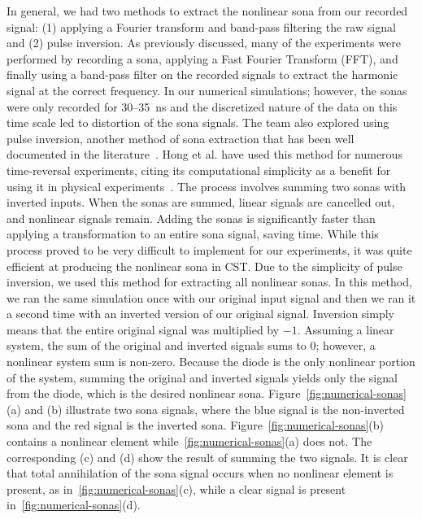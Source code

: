 In general, we had two methods to extract the nonlinear sona from our recorded signal: (1) applying a Fourier transform and band-pass filtering the raw signal and (2) pulse inversion. As previously discussed, many of the \giga{} experiments were performed by recording a sona, applying a Fast Fourier Transform (FFT), and finally using a band-pass filter on the recorded signals to extract the harmonic signal at the correct frequency. In our numerical simulations; however, the sonas were only recorded for \numrange{30}{35}~ns and the discretized nature of the data on this time scale led to distortion of the sona signals.
The team also explored using pulse inversion, another method of sona extraction that has been well documented in the literature~\cite{simpson_pulse_1999,hong_nonlinear_2014}. Hong et al. have used this method for numerous time-reversal experiments, citing its computational simplicity as a benefit for using it in physical experiments~\cite{hong_nonlinear_2014}. The process involves summing two sonas with inverted inputs.  When the sonas are summed, linear signals are cancelled out, and nonlinear signals remain. Adding the sonas is significantly faster than applying a transformation to an entire sona signal, saving time. While this process proved to be very difficult to implement for our \giga{} experiments, it was quite efficient at producing the nonlinear sona in CST.
Due to the simplicity of pulse inversion, we used this method for extracting all nonlinear sonas. In this method, we ran the same simulation once with our original input signal and then we ran it a second time with an inverted version of our original signal. Inversion simply means that the entire original signal was multiplied by $-1$. Assuming a linear system, the sum of the original and inverted signals sums to $0$; however, a nonlinear system sum is non-zero. Because the diode is the only nonlinear portion of the system, summing the original and inverted signals yields only the signal from the diode, which is the desired nonlinear sona. Figure~\ref{fig:numerical-sonas}(a) and (b) illustrate two sona signals, where the blue signal is the non-inverted sona and the red signal is the inverted sona. Figure~\ref{fig:numerical-sonas}(b) contains a nonlinear element while~\ref{fig:numerical-sonas}(a) does not. The corresponding (c) and (d) show the result of summing the two signals. It is clear that total annihilation of the sona signal occurs when no nonlinear element is present, as in~\ref{fig:numerical-sonas}(c), while a clear signal is present in~\ref{fig:numerical-sonas}(d).


